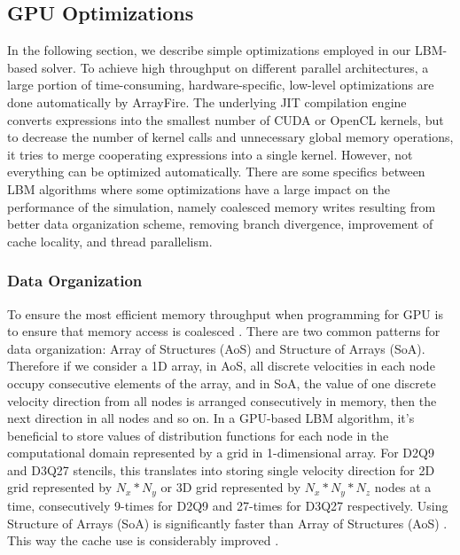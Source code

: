 \subsection{GPU Optimizations}
\label{optimizations-for-gpu}

In the following section, we describe simple optimizations employed in our LBM-based solver. To achieve high throughput on different parallel architectures, a large portion of time-consuming, hardware-specific, low-level optimizations are done automatically by ArrayFire. The underlying JIT compilation engine converts expressions into the smallest number of CUDA or OpenCL kernels, but to decrease the number of kernel calls and unnecessary global memory operations, it tries to merge cooperating expressions into a single kernel. However, not everything can be optimized automatically. There are some specifics between LBM algorithms where some optimizations have a large impact on the performance of the simulation, namely coalesced memory writes resulting from better data organization scheme, removing branch divergence, improvement of cache locality, and thread parallelism.

\subsubsection{Data Organization}
To ensure the most efficient memory throughput when programming for GPU is to ensure that memory access is coalesced \cite{tranPerformanceOptimization3D2017}. There are two common patterns for data organization: Array of Structures (AoS) and Structure of Arrays (SoA). Therefore if we consider a 1D array, in AoS, all discrete velocities in each node occupy consecutive elements of the array, and in SoA, the value of one discrete velocity direction from all nodes is arranged consecutively in memory, then the next direction in all nodes and so on. In a GPU-based LBM algorithm, it's beneficial to store values of distribution functions for each node in the computational domain represented by a grid in 1-dimensional array. For D2Q9 and D3Q27 stencils, this translates into storing single velocity direction for 2D grid represented by $N_x * N_y$ or 3D grid represented by $N_x * N_y * N_z$ nodes at a time, consecutively 9-times for D2Q9 and 27-times for D3Q27 respectively. Using Structure of Arrays (SoA) is significantly faster than Array of Structures (AoS) \cite{tranPerformanceOptimization3D2017, delboscOptimizedImplementationLattice2014}. This way the cache use is considerably improved \cite{Mawson2014InteractiveFI}.

